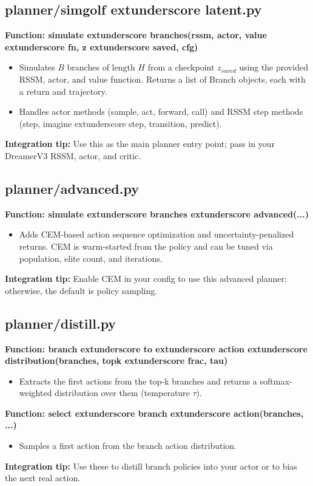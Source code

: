 \documentclass{article}
\begin{document}
\subsection{planner/simgolf	extunderscore latent.py}
\textbf{Function: simulate	extunderscore branches(rssm, actor, value	extunderscore fn, z	extunderscore saved, cfg)}
\begin{itemize}
\item Simulates $B$ branches of length $H$ from a checkpoint $z_{saved}$ using the provided RSSM, actor, and value function. Returns a list of Branch objects, each with a return and trajectory.
\item Handles actor methods (sample, act, forward, call) and RSSM step methods (step, imagine	extunderscore step, transition, predict).
\end{itemize}
\textbf{Integration tip:} Use this as the main planner entry point; pass in your DreamerV3 RSSM, actor, and critic.

\subsection{planner/advanced.py}
\textbf{Function: simulate	extunderscore branches	extunderscore advanced(...)}
\begin{itemize}
\item Adds CEM-based action sequence optimization and uncertainty-penalized returns. CEM is warm-started from the policy and can be tuned via population, elite count, and iterations.
\end{itemize}
\textbf{Integration tip:} Enable CEM in your config to use this advanced planner; otherwise, the default is policy sampling.

\subsection{planner/distill.py}
\textbf{Function: branch	extunderscore to	extunderscore action	extunderscore distribution(branches, topk	extunderscore frac, tau)}
\begin{itemize}
\item Extracts the first actions from the top-k branches and returns a softmax-weighted distribution over them (temperature $\tau$).
\end{itemize}
\textbf{Function: select	extunderscore branch	extunderscore action(branches, ...)}
\begin{itemize}
\item Samples a first action from the branch action distribution.
\end{itemize}
\textbf{Integration tip:} Use these to distill branch policies into your actor or to bias the next real action.
\end{document}
